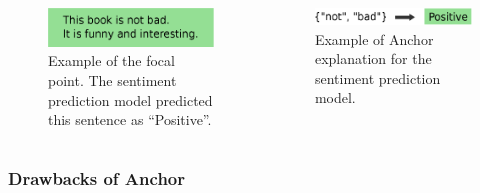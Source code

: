\documentclass[aspectratio=169]{slide-ja}
\begin{document}
\begin{frame}{}
  \begin{columns}[]
    \begin{column}{0.35\textwidth}
      \begin{figure}
        \centering
        \includegraphics[width=\textwidth]{example-instance}
        \caption{%
          Example of the focal point.
          The sentiment prediction model predicted this sentence as ``Positive''.
        }
      \end{figure}
    \end{column}
    \begin{column}{0.4\textwidth}
      \vspace{0.7em}
      \begin{figure}
        \includegraphics[width=\textwidth]{example-anchor}
        \vspace{-0.5em}
        \caption{%
          Example of Anchor explanation for the sentiment prediction model.
        }
      \end{figure}
    \end{column}
  \end{columns}
\end{frame}

\subsubsection{Drawbacks of Anchor}
\end{document}
